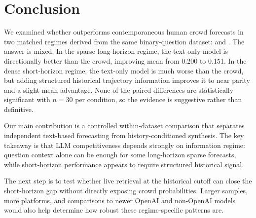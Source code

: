 \section{Conclusion}
\label{sec:conclusion}

We examined whether \gptmodel outperforms contemporaneous human crowd forecasts in two matched regimes derived from the same binary-question dataset: \longterm and \shortterm. The answer is mixed. In the sparse long-horizon regime, the text-only model is directionally better than the crowd, improving mean \brier from 0.200 to 0.151. In the dense short-horizon regime, the text-only model is much worse than the crowd, but adding structured historical trajectory information improves it to near parity and a slight mean advantage. None of the paired differences are statistically significant with $n=30$ per condition, so the evidence is suggestive rather than definitive.

Our main contribution is a controlled within-dataset comparison that separates independent text-based forecasting from history-conditioned synthesis. The key takeaway is that LLM competitiveness depends strongly on information regime: question context alone can be enough for some long-horizon sparse forecasts, while short-horizon performance appears to require structured historical signal.

The next step is to test whether live retrieval at the historical cutoff can close the short-horizon gap without directly exposing crowd probabilities. Larger samples, more platforms, and comparisons to newer OpenAI and non-OpenAI models would also help determine how robust these regime-specific patterns are.

